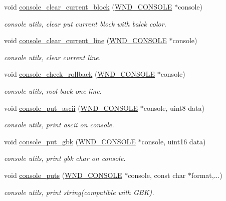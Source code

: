 \begin{DoxyCompactItemize}
void \hyperlink{group__console_gae7d5fc56ae82413411acf5d49dcde21c}{console\+\_\+clear\+\_\+current\+\_\+block} (\hyperlink{struct_w_n_d___c_o_n_s_o_l_e}{W\+N\+D\+\_\+\+C\+O\+N\+S\+O\+L\+E} $\ast$console)
\begin{DoxyCompactList}\small\item\em console utils, clear put current block with balck color. \end{DoxyCompactList}\item 
void \hyperlink{group__console_gad7b5e0b9300402af3be70c4c8e328dc1}{console\+\_\+clear\+\_\+current\+\_\+line} (\hyperlink{struct_w_n_d___c_o_n_s_o_l_e}{W\+N\+D\+\_\+\+C\+O\+N\+S\+O\+L\+E} $\ast$console)
\begin{DoxyCompactList}\small\item\em console utils, clear current line. \end{DoxyCompactList}\item 
void \hyperlink{group__console_ga8745795280bc980ee7e5b0876445013b}{console\+\_\+check\+\_\+rollback} (\hyperlink{struct_w_n_d___c_o_n_s_o_l_e}{W\+N\+D\+\_\+\+C\+O\+N\+S\+O\+L\+E} $\ast$console)
\begin{DoxyCompactList}\small\item\em console utils, rool back one line. \end{DoxyCompactList}\item 
void \hyperlink{group__console_ga3be17914b8a0cd7b400d75e12f86ab8f}{console\+\_\+put\+\_\+ascii} (\hyperlink{struct_w_n_d___c_o_n_s_o_l_e}{W\+N\+D\+\_\+\+C\+O\+N\+S\+O\+L\+E} $\ast$console, uint8 data)
\begin{DoxyCompactList}\small\item\em console utils, print ascii on console. \end{DoxyCompactList}\item 
void \hyperlink{group__console_gaf993d6f7c0c529c279ef0ac414e5dcba}{console\+\_\+put\+\_\+gbk} (\hyperlink{struct_w_n_d___c_o_n_s_o_l_e}{W\+N\+D\+\_\+\+C\+O\+N\+S\+O\+L\+E} $\ast$console, uint16 data)
\begin{DoxyCompactList}\small\item\em console utils, print gbk char on console. \end{DoxyCompactList}\item 
void \hyperlink{group__console_ga6f81d28b215725ec7fe2fc0b2ccf7900}{console\+\_\+puts} (\hyperlink{struct_w_n_d___c_o_n_s_o_l_e}{W\+N\+D\+\_\+\+C\+O\+N\+S\+O\+L\+E} $\ast$console, const char $\ast$format,...)
\begin{DoxyCompactList}\small\item\em console utils, print string(compatible with G\+B\+K). \end{DoxyCompactList}\item 

\end{DoxyCompactItemize}

